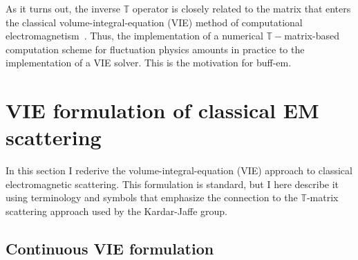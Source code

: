 \documentclass[letterpaper]{article}
\begin{document}
As it turns out, the inverse $\mathbb{T}$ operator is 
closely related to the matrix that enters the classical
volume-integral-equation (VIE) method of computational 
electromagnetism~\cite{SWG1984}. Thus, the implementation
of a numerical $\mathbb{T}-$matrix-based computation scheme
for fluctuation physics amounts in practice to the 
implementation of a VIE solver. This is the motivation
for {\sc buff-em}.

\newpage
{}
\section{VIE formulation of classical EM scattering}

In this section I rederive the volume-integral-equation (VIE)
approach to classical electromagnetic scattering. This formulation
is standard, but I here describe it using terminology and
symbols that emphasize the connection to the $\mathbb{T}$-matrix
scattering approach used by the Kardar-Jaffe group.

\subsection*{Continuous VIE formulation}
\end{document}
